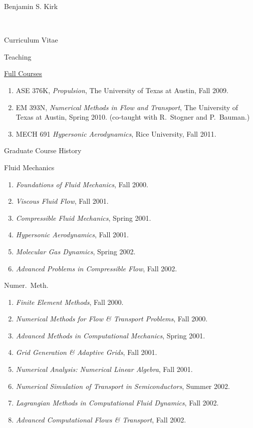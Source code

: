 \documentclass[10pt]{report}
\begin{document}
\begin{cv}{\centerline{\Large Benjamin S. Kirk}\\
    \centerline{\large Curriculum Vitae}}
\begin{cvlist}{Teaching}
    \vspace{1em}
    \item[\underline{Full Courses}]
      \begin{enumerate}
        \item ASE 376K, \emph{Propulsion}, The University of Texas at Austin, Fall 2009.
        \item EM 393N, \emph{Numerical Methods in Flow and Transport}, The University of Texas at Austin, Spring 2010. (co-taught with R.~Stogner and P.~Bauman.)
        \item MECH 691 \emph{Hypersonic Aerodynamics}, Rice University, Fall 2011.
      \end{enumerate}
  \end{cvlist}


  \begin{cvlist}{Graduate Course History}
      \item[Fluid Mechanics]

	\begin{enumerate}
  	  \item \emph{Foundations of Fluid Mechanics}, Fall 2000.
	  \item \emph{Viscous Fluid Flow}, Fall 2001.
	  \item \emph{Compressible Fluid Mechanics}, Spring 2001.
	  \item \emph{Hypersonic Aerodynamics}, Fall 2001.
	  \item \emph{Molecular Gas Dynamics}, Spring 2002.
	  \item \emph{Advanced Problems in Compressible Flow}, Fall 2002.
	\end{enumerate}

      \vspace{.5em}
      \item[Numer.\ Meth.]
	\begin{enumerate}
	  \item \emph{Finite Element Methods}, Fall 2000.
	  \item \emph{Numerical Methods for Flow \& Transport Problems}, Fall 2000.
	  \item \emph{Advanced Methods in Computational Mechanics}, Spring 2001.
	  \item \emph{Grid Generation \& Adaptive Grids}, Fall 2001.
	  \item \emph{Numerical Analysis: Numerical Linear Algebra}, Fall 2001.
	  \item \emph{Numerical Simulation of Transport in Semiconductors}, Summer 2002.
	  \item \emph{Lagrangian Methods in Computational Fluid Dynamics}, Fall 2002.
	  \item \emph{Advanced Computational Flows \& Transport}, Fall 2002.
	\end{enumerate}


\end{cvlist}
\end{cv}
\end{document}
